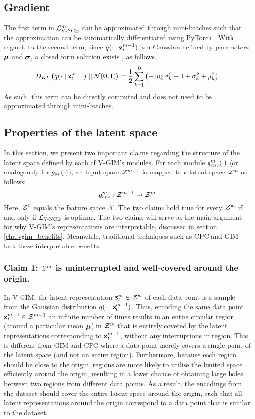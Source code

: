 	\subsection{Gradient}
		The first term in $\mathcal{L}_{\text{V-NCE}}^m$ can be approximated through mini-batches such that the approximation can be automatically differentiated using PyTorch \cite{paszkeAutomaticDifferentiationPyTorch2017}. With regards to the second term, since $q(\cdot \mid \mathbf{z}_t^{m-1})$ is a Gaussian defined by parameters $\bm{\mu}$ and $\bm{\sigma}$, a closed form solution exists \cite{kingmaAutoEncodingVariationalBayes2022}, as follows.
		\begin{equation} %
			\latentspaceconstraintgim = \latentspaceconstraintclosedformNoI
		\end{equation}
		As such, this term can be directly computed and does not need to be approximated through mini-batches.
	
		
	
	\subsection{Properties of the latent space} \label{cha:contin_space}	
	In this section, we present two important claims regarding the structure of the latent space defined by each of V-GIM's modules. For each module $g_{enc}^m(\cdot)$ (or analogously for $g_{ar}(\cdot)$), an input space $\mathcal{Z}^{m-1}$ is mapped to a latent space $\mathcal{Z}^m$ as follows: 
	$$g_{enc}^m: \mathcal{Z}^{m-1} \rightarrow \mathcal{Z}^m$$
	Here, $\mathcal{Z}^0$ equals the feature space $\mathcal{X}$. The two claims hold true for every $\mathcal{Z}^m$ if and only if $\mathcal{L}_{\text{V-NCE}}$ is optimal. The two claims will serve as the main argument for why V-GIM's representations are interpretable, discussed in section \ref{cha:vgim_benefits}. Meanwhile, traditional techniques such as CPC and GIM lack these interpretable benefits.
	
		\subsubsection{Claim 1: $\mathcal{Z}^m$ is uninterrupted and well-covered around the origin.}
			In V-GIM, the latent representation $\mathbf{z}_t^m \in \mathcal{Z}^m$ of each data point is a sample from the Gaussian distribution $q(\cdot \mid \mathbf{z}_t^{m-1})$. Thus, encoding the same data point $\mathbf{z}_t^{m-1} \in \mathcal{Z}^{m-1}$ an infinite number of times results in an entire circular region (around a particular mean $\bm{\mu}$) in $\mathcal{Z}^m$ that is entirely covered by the latent representations corresponding to $\mathbf{z}_t^{m-1}$, without any interruptions in region. This is different from GIM and CPC where a data point merely covers a single point of the latent space (and not an entire region). Furthermore, because each region should be close to the origin, regions are more likely to utilise the limited space efficiently around the origin, resulting in a lower chance of obtaining large holes between two regions from different data points. As a result, the encodings from the dataset should cover the entire latent space around the origin, such that all latent representations around the origin correspond to a data point that is similar to the dataset.
		
